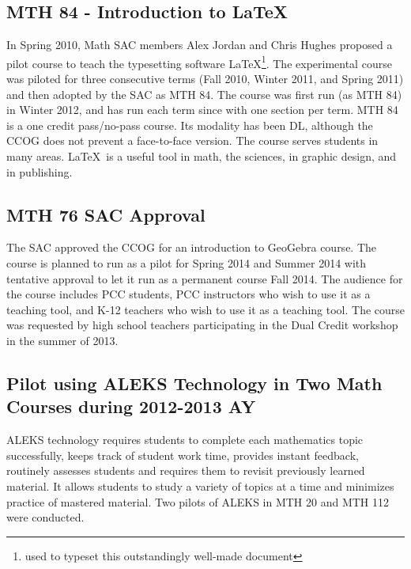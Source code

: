 \subsection{MTH 84 - Introduction to \LaTeX}
In Spring 2010, Math SAC members Alex Jordan and Chris Hughes proposed a pilot course to teach the typesetting software \LaTeX\footnote{used to typeset this outstandingly well-made document}.  The experimental course was piloted for three consecutive terms (Fall 2010, Winter 2011, and Spring 2011) and then adopted by the SAC as MTH 84.  The course was first run (as MTH 84) in Winter 2012, and has run each term since with one section per term. MTH 84 is a one credit pass/no-pass course. Its modality has been DL, although the CCOG does not prevent a face-to-face version.  The course serves students in many areas.  \LaTeX\ is a useful tool in math, the sciences, in graphic design, and in publishing. 
 
\subsection{MTH 76 SAC Approval}
The SAC approved the CCOG for an introduction to GeoGebra course. The course is planned to run as a pilot for Spring 2014 and Summer 2014 with tentative approval to let it run as a permanent course Fall 2014.  The audience for the course includes PCC students, PCC instructors who wish to use it as a teaching tool, and K-12 teachers who wish to use it as a teaching tool.  The course was requested by high school teachers participating in the Dual Credit workshop in the summer of 2013.

\subsection[ALEKS pilot]{Pilot using ALEKS Technology in Two Math Courses during 2012-2013 AY}\label{sec3:subset:alekspilot}
ALEKS technology requires students to complete each mathematics topic successfully, keeps track of student work time, provides instant feedback, routinely assesses students and requires them to revisit previously learned material.  It allows students to study a variety of topics at a time and minimizes practice of mastered material. Two pilots of ALEKS in MTH 20 and MTH 112 were conducted.

